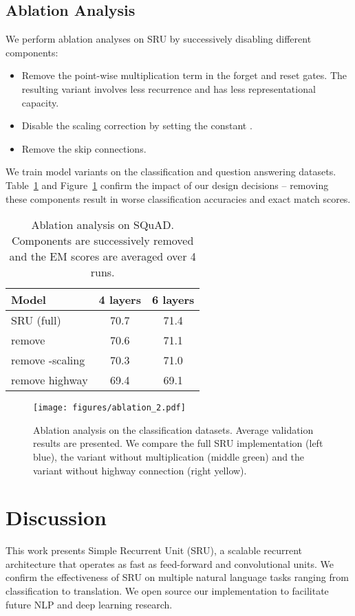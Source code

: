 \documentclass[11pt,a4paper]{article}
\begin{document}
\subsection{Ablation Analysis}
\label{sec:exp:ablation}


We perform ablation analyses on SRU by successively disabling different components:
\begin{itemize}
\item[(1)] Remove the point-wise multiplication term  in the forget and reset gates. The resulting variant involves less recurrence and has less representational capacity.
\item[(2)] Disable the scaling correction by setting the constant .
\item[(3)] Remove the skip connections.\end{itemize}
We train model variants on the classification and question answering datasets.
Table~\ref{table:ablation} and Figure~\ref{fig:ablation} confirm the impact of our design decisions -- 
removing these components result in worse classification accuracies and exact match scores.

\begin{table}[!t!]
\centering
\begin{tabular}{lc@{~~~~~}c@{~~~}}
\toprule
Model & 4 layers & 6 layers \\
\midrule
SRU (full) &  70.7 & 71.4\\
   remove  & 70.6 & 71.1\\
   remove -scaling & 70.3 & 71.0\\
   remove highway & 69.4 & 69.1\\
\bottomrule
\end{tabular}
\caption{Ablation analysis on SQuAD. Components are successively removed and the EM scores are averaged over 4 runs.}
\label{table:ablation}
\end{table}

\begin{figure}[!t!]
\centering
\vspace{0.2in}
\texttt{[image: figures/ablation\_2.pdf]}
\caption{Ablation analysis on the classification datasets.
Average validation results are presented. 
We compare the full SRU implementation (left blue), the variant without  multiplication (middle green) and the variant without highway connection (right yellow).}
\label{fig:ablation}
\end{figure}
 \section{Discussion}
This work presents Simple Recurrent Unit (SRU), a scalable recurrent architecture that operates as fast as feed-forward and convolutional units.
We confirm the effectiveness of SRU on multiple natural language tasks ranging from classification to translation.
We open source our implementation to facilitate future NLP and deep learning research.
\end{document}
